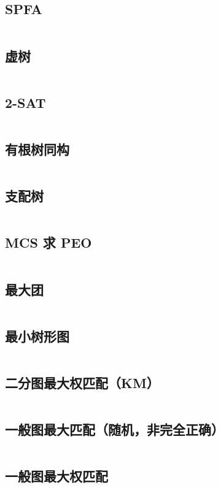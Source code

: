 \documentclass[a4paper,9]{article}
\begin{document}
\subsection{SPFA}
\inputminted[breaklines]{c++}{source/graph/spfa.cpp}
\subsection{虚树}
\inputminted[breaklines]{c++}{source/graph/xushu.cpp}
\subsection{2-SAT}
\inputminted[breaklines]{c++}{source/graph/2-sat.cpp}
\subsection{有根树同构}
\inputminted[breaklines]{c++}{source/graph/rooted-tree-isom.cpp}
\subsection{支配树}
\inputminted[breaklines,breakanywhere]{c++}{source/graph/dominator.cpp}
\subsection{MCS 求 PEO}
\inputminted[breaklines]{c++}{source/graph/MCS.cpp}
\subsection{最大团}
\inputminted[breaklines]{c++}{source/graph/maximum-clique.cpp}
\subsection{最小树形图}
\inputminted[breaklines]{c++}{source/graph/dmst.cpp}
\subsection{二分图最大权匹配（KM）}
\inputminted[breaklines]{c++}{source/graph/KM.cpp}
\subsection{一般图最大匹配（随机，非完全正确）}
\inputminted[breaklines]{c++}{source/graph/random-match.cpp}
\subsection{一般图最大权匹配}
\inputminted[breaklines,breakanywhere]{c++}{source/graph/blossom.cpp}
\end{document}

